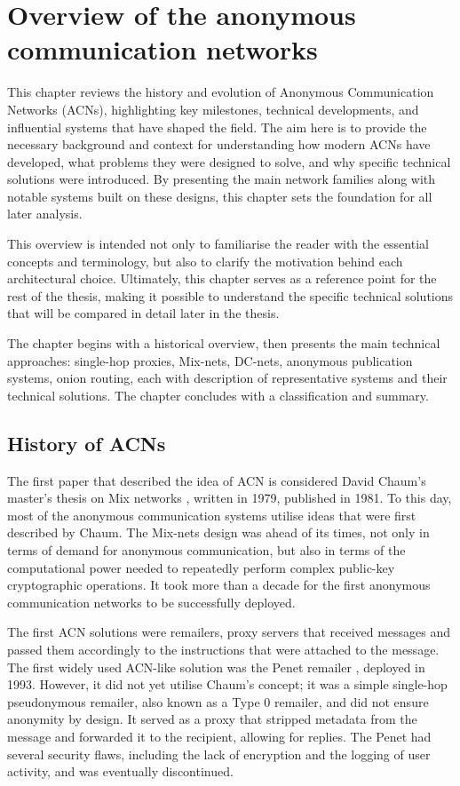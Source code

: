 \chapter{Overview of the anonymous communication networks }
\label{chap:Overview}

This chapter reviews the history and evolution of Anonymous Communication Networks (ACNs), highlighting key milestones, technical developments, and influential systems that have shaped the field. The aim here is to provide the necessary background and context for understanding how modern ACNs have developed, what problems they were designed to solve, and why specific technical solutions were introduced. By presenting the main network families along with notable systems built on these designs, this chapter sets the foundation for all later analysis.

This overview is intended not only to familiarise the reader with the essential concepts and terminology, but also to clarify the motivation behind each architectural choice. Ultimately, this chapter serves as a reference point for the rest of the thesis, making it possible to understand the specific technical solutions that will be compared in detail later in the thesis.

The chapter begins with a historical overview, then presents the main technical approaches: single-hop proxies, Mix-nets, DC-nets, anonymous publication systems, onion routing, each with description of representative systems and their technical solutions. The chapter concludes with a classification and summary.

\section{History of ACNs}
The first paper that described the idea of ACN is considered David Chaum's master's thesis on Mix networks \cite{Chaum81}, written in 1979, published in 1981. To this day, most of the anonymous communication systems utilise ideas that were first described by Chaum. The Mix-nets design was ahead of its times, not only in terms of demand for anonymous communication, but also in terms of the computational power needed to repeatedly perform complex public-key cryptographic operations. It took more than a decade for the first anonymous communication networks to be successfully deployed.

The first ACN solutions were remailers, proxy servers that received messages and passed them accordingly to the instructions that were attached to the message.
The first widely used ACN-like solution was the Penet remailer \cite{penet}, deployed in 1993. However, it did not yet utilise Chaum’s concept; it was a simple single-hop pseudonymous remailer, also known as a Type 0 remailer, and did not ensure anonymity by design. It served as a proxy that stripped metadata from the message and forwarded it to the recipient, allowing for replies. The Penet had several security flaws, including the lack of encryption and the logging of user activity, and was eventually discontinued.

